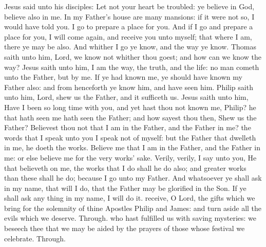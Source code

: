  Jesus said unto his disciples: Let not your heart be troubled: ye believe in God, believe also in me. In my Father's house are many mansions: if it were not so, I would have told you. I go to prepare a place for you. And if I go and prepare a place for you, I will come again, and receive you unto myself; that where I am, there ye may be also. And whither I go ye know, and the way ye know. Thomas saith unto him, Lord, we know not whither thou goest; and how can we know the way? Jesus saith unto him, I am the way, the truth, and the life: no man cometh unto the Father, but by me. If ye had known me, ye should have known my Father also: and from henceforth ye know him, and have seen him. Philip saith unto him, Lord, shew us the Father, and it sufficeth us. Jesus saith unto him, Have I been so long time with you, and yet hast thou not known me, Philip? he that hath seen me hath seen the Father; and how sayest thou then, Shew us the Father? Believest thou not that I am in the Father, and the Father in me? the words that I speak unto you I speak not of myself: but the Father that dwelleth in me, he doeth the works. Believe me that I am in the Father, and the Father in me: or else believe me for the very works' sake. Verily, verily, I say unto you, He that believeth on me, the works that I do shall he do also; and greater works than these shall he do; because I go unto my Father. And whatsoever ye shall ask in my name, that will I do, that the Father may be glorified in the Son. If ye shall ask any thing in my name, I will do it.
\secret
{} receive, O Lord, the gifts which we bring for the solemnity of thine Apostles Philip and James: and turn aside all the evils which we deserve. Through.
\postcommunion
{} who hast fulfilled us with saving mysteries: we beseech thee that we may be aided by the prayers of those whose festival we celebrate. Through.

